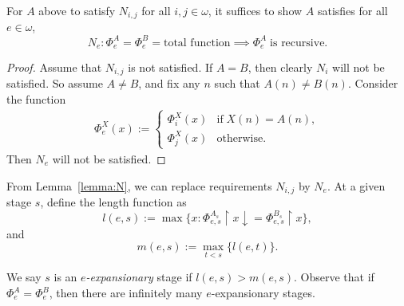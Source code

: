   \begin{lemma}
    \label{lemma:N}
    For $A$ above to satisfy $N_{i,j}$ for all
    $i,j\in\omega$, it suffices to show $A$ satisfies for all
    $e\in\omega$,
    \begin{equation}
      N_e: \Phi_e^A=\Phi_e^B =\text{total function} \implies \Phi_e^A\;
      \text{is recursive}.
      \label{eqn:cappable2}
    \end{equation}
  \end{lemma}
  \begin{proof}
    Assume that $N_{i,j}$ is not satisfied. If $A=B$, then
    clearly $N_i$ will not be satisfied. So assume $A\neq B$, and fix any
    $n$ such that $A(n)\neq B(n)$. Consider the function
    \begin{align*}
      \Phi_e^X(x) :=
      \begin{cases}
        \Phi_i^X(x) &\text{if}\; X(n)=A(n),\\
        \Phi_j^X(x) &\text{otherwise}.
      \end{cases}
    \end{align*}
    Then $N_e$ will not be satisfied.
  \end{proof}

  \begin{notation}
    From Lemma~\ref{lemma:N}, we can replace requirements $N_{i,j}$ by
    $N_e$. At a given stage $s$, define the length function as
    \[l(e,s) :=\max\{x: \Phi_{e,s}^{A_s}\restriction x
    \downarrow=\Phi_{e,s}^{B_s}\restriction x\},\]
    and
    \[m(e,s) :=\max_{t<s}\{l(e,t)\}.\]
    
    We say $s$ is an \textit{$e$-expansionary} stage if $l(e,s)>m(e,s)$.
    Observe that if $\Phi^A_e=\Phi^B_e$, then there are infinitely many
    $e$-expansionary stages.\\
  \end{notation}

